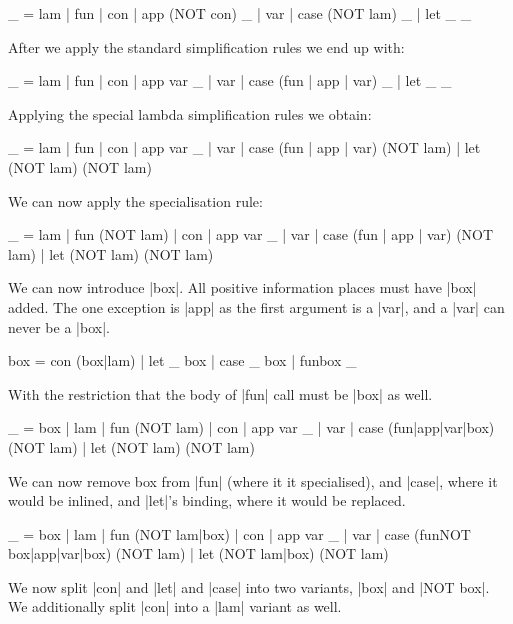 \documentclass[preprint]{sigplanconf}
\begin{document}
\begin{code}
_ = lam | fun | con | app (NOT con)  _ | var | case (NOT lam) _ | let _ _
\end{code}

After we apply the standard simplification rules we end up with:

\begin{code}
_ = lam | fun | con | app var  _ | var | case (fun | app | var) _ | let _ _
\end{code}

Applying the special lambda simplification rules we obtain:

\begin{code}
_ = lam | fun | con | app var  _ | var | case (fun | app | var) (NOT lam) | let (NOT lam) (NOT lam)
\end{code}

We can now apply the specialisation rule:

\begin{code}
_ = lam | fun (NOT lam) | con | app var  _ | var | case (fun | app | var) (NOT lam) | let (NOT lam) (NOT lam)
\end{code}

We can now introduce |box|. All positive information places must have |box| added. The one exception is |app| as the first argument is a |var|, and a |var| can never be a |box|.

\begin{code}
box = con (box|lam) | let _ box | case _ box | fun{box} _
\end{code}

With the restriction that the body of |fun| call must be |box| as well.


\begin{code}
_ = box | lam | fun (NOT lam) | con | app var  _ | var | case (fun|app|var|box) (NOT lam) | let (NOT lam) (NOT lam)
\end{code}

We can now remove box from |fun| (where it it specialised), and |case|, where it would be inlined, and |let|'s binding, where it would be replaced.

\begin{code}
_ = box | lam | fun (NOT lam|box) | con | app var  _ | var | case (fun{NOT box}|app|var|box) (NOT lam) | let (NOT lam|box) (NOT lam)
\end{code}

We now split |con| and |let| and |case| into two variants, |box| and |NOT box|. We additionally split |con| into a |lam| variant as well.
\end{document}
